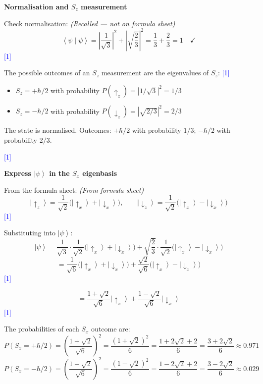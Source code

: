 \documentclass[12pt,a4paper]{article}
\newcommand{\markstep}[1]{\hfill\textcolor{blue}{[#1]}}
\newcommand{\finalanswer}[1]{%
  \begin{tcolorbox}[colback=green!5!white,colframe=green!50!black,boxrule=0.5pt]
  #1
  \end{tcolorbox}
}
\newcommand{\fromsheet}{\textit{(From formula sheet)}}
\newcommand{\recalled}{\textit{(Recalled --- not on formula sheet)}}
\renewcommand{\ket}[1]{\left|#1\right\rangle}
\renewcommand{\braket}[2]{\left\langle #1\middle|#2\right\rangle}
\begin{document}
\begin{parts}

\item \textbf{Normalisation and $S_z$ measurement} 

Check normalisation: \recalled
\[
\braket{\psi}{\psi} = \left|\frac{1}{\sqrt{3}}\right|^2 + \left|\sqrt{\frac{2}{3}}\right|^2 = \frac{1}{3} + \frac{2}{3} = 1 \quad\checkmark
\]
\markstep{1}

The possible outcomes of an $S_z$ measurement are the eigenvalues of $S_z$: \markstep{1}
\begin{itemize}
\item $S_z = +\hbar/2$ with probability $P(\uparrow_z) = |1/\sqrt{3}|^2 = 1/3$
\item $S_z = -\hbar/2$ with probability $P(\downarrow_z) = |\sqrt{2/3}|^2 = 2/3$
\end{itemize}

\finalanswer{The state is normalised. Outcomes: $+\hbar/2$ with probability $1/3$; $-\hbar/2$ with probability $2/3$.}
\markstep{1}

\item \textbf{Express $\ket{\psi}$ in the $S_x$ eigenbasis} 

From the formula sheet: \fromsheet
\[
\ket{\!\uparrow_z} = \frac{1}{\sqrt{2}}\bigl(\ket{\!\uparrow_x} + \ket{\!\downarrow_x}\bigr), \qquad \ket{\!\downarrow_z} = \frac{1}{\sqrt{2}}\bigl(\ket{\!\uparrow_x} - \ket{\!\downarrow_x}\bigr)
\]
\markstep{1}

Substituting into $\ket{\psi}$:
\[
\ket{\psi} = \frac{1}{\sqrt{3}}\cdot\frac{1}{\sqrt{2}}\bigl(\ket{\!\uparrow_x} + \ket{\!\downarrow_x}\bigr) + \sqrt{\frac{2}{3}}\cdot\frac{1}{\sqrt{2}}\bigl(\ket{\!\uparrow_x} - \ket{\!\downarrow_x}\bigr)
\]
\[
= \frac{1}{\sqrt{6}}\bigl(\ket{\!\uparrow_x} + \ket{\!\downarrow_x}\bigr) + \frac{\sqrt{2}}{\sqrt{6}}\bigl(\ket{\!\uparrow_x} - \ket{\!\downarrow_x}\bigr)
\]
\markstep{1}

\[
= \frac{1+\sqrt{2}}{\sqrt{6}}\ket{\!\uparrow_x} + \frac{1-\sqrt{2}}{\sqrt{6}}\ket{\!\downarrow_x}
\]
\markstep{1}

The probabilities of each $S_x$ outcome are:
\[
P(S_x = +\hbar/2) = \left(\frac{1+\sqrt{2}}{\sqrt{6}}\right)^2 = \frac{(1+\sqrt{2})^2}{6} = \frac{1 + 2\sqrt{2} + 2}{6} = \frac{3+2\sqrt{2}}{6} \approx 0.971
\]
\[
P(S_x = -\hbar/2) = \left(\frac{1-\sqrt{2}}{\sqrt{6}}\right)^2 = \frac{(1-\sqrt{2})^2}{6} = \frac{1 - 2\sqrt{2} + 2}{6} = \frac{3-2\sqrt{2}}{6} \approx 0.029
\]


\end{parts}
\end{document}
